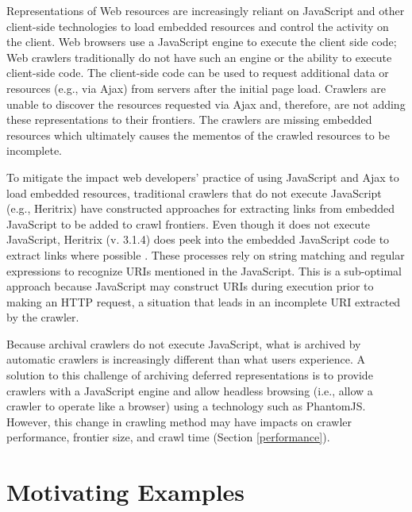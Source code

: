 \documentclass{sig-alternate}
\begin{document}
Representations of Web resources are increasingly reliant on JavaScript and other client-side technologies to load embedded resources and control the activity on the client. Web browsers use a JavaScript engine to execute the client side code; Web crawlers traditionally do not have such an engine or the ability to execute client-side code. The client-side code can be used to request additional data or resources (e.g., via Ajax) from servers after the initial page load. Crawlers are unable to discover the resources requested via Ajax and, therefore, are not adding these representations to their frontiers. The crawlers are missing embedded resources which ultimately causes the mementos of the crawled resources to be incomplete. 

To mitigate the impact web developers' practice of using JavaScript and Ajax to load embedded resources, traditional crawlers that do not execute JavaScript (e.g., Heritrix) have constructed approaches for extracting links from embedded JavaScript to be added to crawl frontiers. Even though it does not execute JavaScript, Heritrix (v. 3.1.4) does peek into the embedded JavaScript code to extract links where possible \cite{htrixJS}. These processes rely on string matching and regular expressions to recognize URIs mentioned in the JavaScript. This is a sub-optimal approach because JavaScript may construct URIs during execution prior to making an HTTP request, a situation that leads in an incomplete URI extracted by the crawler.  

Because archival crawlers do not execute JavaScript, what is archived by automatic crawlers is increasingly different than what users experience. A solution to this challenge of archiving deferred representations is to provide crawlers with a JavaScript engine and allow headless browsing (i.e., allow a crawler to operate like a browser) using a technology such as PhantomJS. However, this change in crawling method may have impacts on crawler performance, frontier size, and crawl time (Section \ref{performance}).



\section{Motivating Examples}
\label{example}
\end{document}
